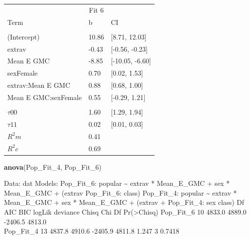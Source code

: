 \documentclass[]{article}
\newenvironment{Shaded}{\begin{snugshade}}{\end{snugshade}}
\newcommand{\KeywordTok}[1]{\textcolor[rgb]{0.13,0.29,0.53}{\textbf{#1}}}
\newcommand{\DecValTok}[1]{\textcolor[rgb]{0.00,0.00,0.81}{#1}}
\newcommand{\NormalTok}[1]{#1}
\begin{document}
\begin{tabular}{lll}
\toprule
\multicolumn{1}{c}{ } & \multicolumn{1}{c}{Fit 6} \\
\cmidrule(l{2pt}r{2pt}){2-2}
Term & b & CI\\
\midrule
\addlinespace[0.3em]
\multicolumn{3}{l}{\textbf{Fixed}}\\
\hspace{1em}(Intercept) & 10.86 & [8.71, 12.03]\\
\hspace{1em}extrav & -0.43 & [-0.56, -0.23]\\
\hspace{1em}Mean E GMC & -8.85 & [-10.05, -6.60]\\
\hspace{1em}sexFemale & 0.70 & [0.02, 1.53]\\
\hspace{1em}extrav:Mean E GMC & 0.88 & [0.68, 1.00]\\
\hspace{1em}Mean E GMC:sexFemale & 0.55 & [-0.29, 1.21]\\
\addlinespace[0.3em]
\multicolumn{3}{l}{\textbf{Random}}\\
\hspace{1em}$\tau {00}$ & 1.60 & [1.29, 1.94]\\
\hspace{1em}$\tau {11}$ & 0.02 & [0.01, 0.03]\\
$R^2 m$ & 0.41 & \\
$R^2 c$ & 0.69 & \\
\bottomrule
\end{tabular}

\begin{Shaded}
\begin{Highlighting}[]
\KeywordTok{anova}\NormalTok{(Pop_Fit_}\DecValTok{4}\NormalTok{, Pop_Fit_}\DecValTok{6}\NormalTok{)}
\end{Highlighting}
\end{Shaded}

Data: dat Models: Pop\_Fit\_6: popular \textasciitilde{} extrav *
Mean\_E\_GMC + sex * Mean\_E\_GMC + (extrav \textbar{} Pop\_Fit\_6:
class) Pop\_Fit\_4: popular \textasciitilde{} extrav * Mean\_E\_GMC +
sex * Mean\_E\_GMC + (extrav + Pop\_Fit\_4: sex \textbar{} class) Df AIC
BIC logLik deviance Chisq Chi Df Pr(\textgreater{}Chisq) Pop\_Fit\_6 10
4833.0 4889.0 -2406.5 4813.0\\
Pop\_Fit\_4 13 4837.8 4910.6 -2405.9 4811.8 1.247 3 0.7418
\end{document}
